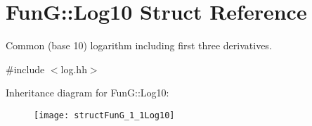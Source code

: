 \hypertarget{structFunG_1_1Log10}{\section{Fun\-G\-:\-:Log10 Struct Reference}
\label{structFunG_1_1Log10}
}


Common (base 10) logarithm including first three derivatives.  




{\ttfamily \#include $<$log.\-hh$>$}

Inheritance diagram for Fun\-G\-:\-:Log10\-:\begin{figure}[H]
\begin{center}
\leavevmode
\texttt{[image: structFunG\_1\_1Log10]}
\end{center}
\end{figure}
